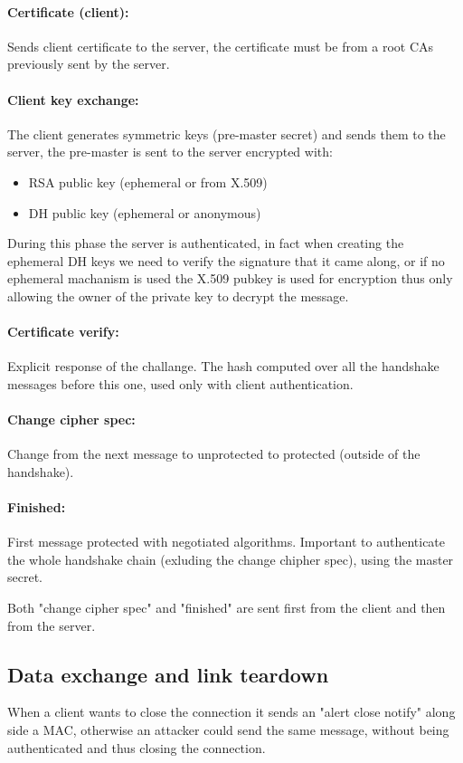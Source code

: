 \documentclass[12pt]{article}
\begin{document}
\paragraph{Certificate (client):}
Sends client certificate to the server, the certificate must be from a root CAs previously sent by the server.

\paragraph{Client key exchange:}
The client generates symmetric keys (pre-master secret) and sends them to the server, the pre-master is sent to the server encrypted with:
\begin{itemize}
  \item RSA public key (ephemeral or from X.509)
  \item DH public key (ephemeral or anonymous)
\end{itemize}
During this phase the server is authenticated, in fact when creating the ephemeral DH keys we need to verify the signature that it came along, or if no ephemeral machanism is used the X.509 pubkey is used for encryption thus only allowing the owner of the private key to decrypt the message.

\paragraph{Certificate verify:}
Explicit response of the challange. The hash computed over all the handshake messages before this one, used only with client authentication.

\paragraph{Change cipher spec:}
Change from the next message to unprotected to protected (outside of the handshake).

\paragraph{Finished:}
First message protected with negotiated algorithms. Important to authenticate the whole handshake chain (exluding the change chipher spec), using the master secret.

Both "change cipher spec" and "finished" are sent first from the client and then from the server.


\subsection{Data exchange and link teardown}
When a client wants to close the connection it sends an "alert close notify" along side a MAC, otherwise an attacker could send the same message, without being authenticated and thus closing the connection.
\end{document}
